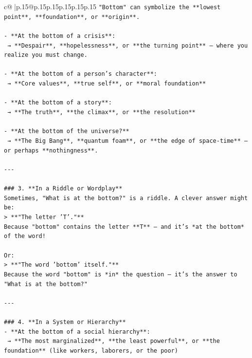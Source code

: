 \documentclass{article}
\begin{document}
{\begin{supertabular}{c@{$\;$}|p{.15\linewidth}@{}p{.15\linewidth}p{.15\linewidth}p{.15\linewidth}p{.15\linewidth}p{.15\linewidth}}
{{{\texttt{"Bottom" can symbolize the **lowest point**, **foundation**, or **origin**.} \\
\\ 
\texttt{{-} **At the bottom of a crisis**:  } \\
\texttt{  → **Despair**, **hopelessness**, or **the turning point** — where you realize you must change.} \\
\\ 
\texttt{{-} **At the bottom of a person’s character**:  } \\
\texttt{  → **Core values**, **true self**, or **moral foundation**} \\
\\ 
\texttt{{-} **At the bottom of a story**:  } \\
\texttt{  → **The truth**, **the climax**, or **the resolution**} \\
\\ 
\texttt{{-} **At the bottom of the universe?**  } \\
\texttt{  → **The Big Bang**, **quantum foam**, or **the edge of space{-}time** — or perhaps **nothingness**.} \\
\\ 
\texttt{{-}{-}{-}} \\
\\ 
\texttt{\#\#\# 3. **In a Riddle or Wordplay**} \\
\texttt{Sometimes, "What is at the bottom?" is a riddle. A clever answer might be:} \\
\texttt{> **"The letter 'T'."**  } \\
\texttt{Because "bottom" contains the letter **T** — and it’s *at the bottom* of the word!} \\
\\ 
\texttt{Or:} \\
\texttt{> **"The word 'bottom' itself."**  } \\
\texttt{Because the word "bottom" is *in* the question — it’s the answer to "What is at the bottom?"} \\
\\ 
\texttt{{-}{-}{-}} \\
\\ 
\texttt{\#\#\# 4. **In a System or Hierarchy**} \\
\texttt{{-} **At the bottom of a social hierarchy**:  } \\
\texttt{  → **The most marginalized**, **the least powerful**, or **the foundation** (like workers, laborers, or the poor)} \\
}}}
\end{supertabular}}
\end{document}
